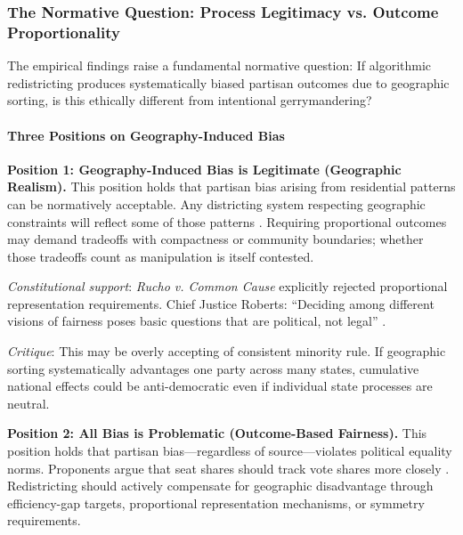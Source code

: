 
\subsubsection{The Normative Question: Process Legitimacy vs. Outcome Proportionality}
\label{sec:normative_framework}

The empirical findings raise a fundamental normative question: If algorithmic redistricting produces systematically biased partisan outcomes due to geographic sorting, is this ethically different from intentional gerrymandering?

\paragraph{Three Positions on Geography-Induced Bias}

\textbf{Position 1: Geography-Induced Bias is Legitimate (Geographic Realism).}
This position holds that partisan bias arising from residential patterns can be normatively acceptable. Any districting system respecting geographic constraints will reflect some of those patterns \citep{rodden2019why}. Requiring proportional outcomes may demand tradeoffs with compactness or community boundaries; whether those tradeoffs count as manipulation is itself contested.

\textit{Constitutional support}: \textit{Rucho v. Common Cause} explicitly rejected proportional representation requirements. Chief Justice Roberts: ``Deciding among different visions of fairness poses basic questions that are political, not legal'' \citep{rucho2019}.

\textit{Critique}: This may be overly accepting of consistent minority rule. If geographic sorting systematically advantages one party across many states, cumulative national effects could be anti-democratic even if individual state processes are neutral.

\textbf{Position 2: All Bias is Problematic (Outcome-Based Fairness).}
This position holds that partisan bias---regardless of source---violates political equality norms. Proponents argue that seat shares should track vote shares more closely \citep{mcgann2016gerrymandering}. Redistricting should actively compensate for geographic disadvantage through efficiency-gap targets, proportional representation mechanisms, or symmetry requirements.

